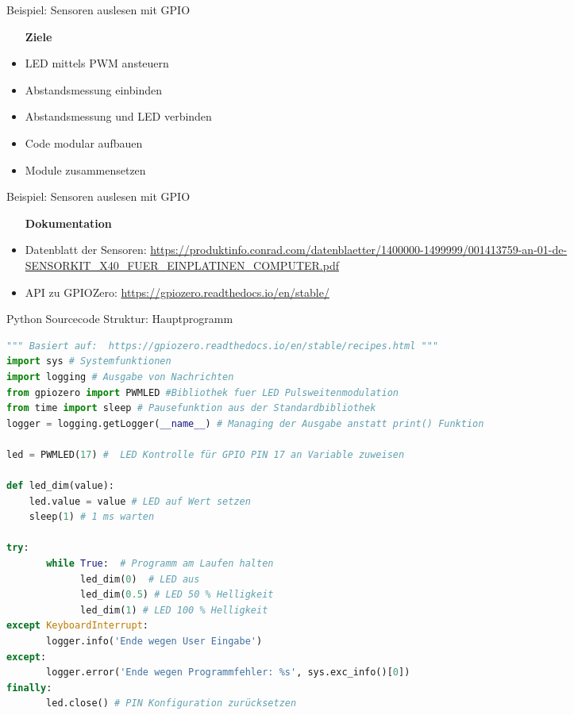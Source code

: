 \begin{frame}{Beispiel: Sensoren auslesen mit GPIO}
    \begin{itemize}
    \setlength{\itemindent}{.4in}
     \item [\textbf{ Ziele}]
    \end{itemize}
    \begin{itemize}
        \item  LED mittels PWM ansteuern
        \item  Abstandsmessung einbinden
        \item  Abstandsmessung und LED verbinden
        \item  Code modular aufbauen
        \item  Module zusammensetzen 
     \end{itemize}
\end{frame}


\begin{frame}{Beispiel: Sensoren auslesen mit GPIO}
    \begin{itemize}
    \setlength{\itemindent}{1.0in}
     \item [\textbf{ Dokumentation}]
    \end{itemize}

    \begin{itemize}
        \item  Datenblatt der Sensoren: \url{https://produktinfo.conrad.com/datenblaetter/1400000-1499999/001413759-an-01-de-SENSORKIT_X40_FUER_EINPLATINEN_COMPUTER.pdf}
        \item  API zu GPIOZero: \url{https://gpiozero.readthedocs.io/en/stable/} 
     \end{itemize}
\end{frame}


\begin{frame}[fragile]{Python Sourcecode Struktur: Hauptprogramm}
\begin{lstlisting}[language=Python]
""" Basiert auf:  https://gpiozero.readthedocs.io/en/stable/recipes.html """
import sys # Systemfunktionen
import logging # Ausgabe von Nachrichten
from gpiozero import PWMLED #Bibliothek fuer LED Pulsweitenmodulation
from time import sleep # Pausefunktion aus der Standardbibliothek
logger = logging.getLogger(__name__) # Managing der Ausgabe anstatt print() Funktion

led = PWMLED(17) #  LED Kontrolle für GPIO PIN 17 an Variable zuweisen

def led_dim(value):
    led.value = value # LED auf Wert setzen
    sleep(1) # 1 ms warten

try:
       while True:  # Programm am Laufen halten
             led_dim(0)  # LED aus
             led_dim(0.5) # LED 50 % Helligkeit
             led_dim(1) # LED 100 % Helligkeit
except KeyboardInterrupt:  
       logger.info('Ende wegen User Eingabe')
except:  
       logger.error('Ende wegen Programmfehler: %s', sys.exc_info()[0])
finally:  
       led.close() # PIN Konfiguration zurücksetzen

\end{lstlisting}
\end{frame}


